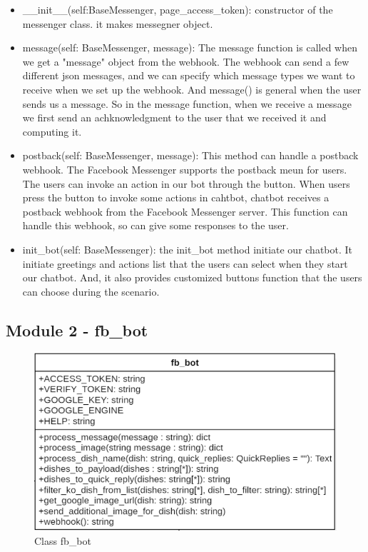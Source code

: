 \begin{itemize}
\item \_\_init\_\_(self:BaseMessenger, page\_access\_token): constructor of the messenger class. it makes messegner object.\newline
\item message(self: BaseMessenger, message): The message function is called when we get a "message" object from the webhook. The webhook can send a few different json messages, and we can specify which message types we want to receive when we set up the webhook. And message() is general when the user sends us a message. So in the message function, when we receive a message we first send an achknowledgment to the user that we received it and computing it. \newline
\item postback(self: BaseMessenger, message): This method can handle a postback webhook. The Facebook Messenger supports the postback meun for users. The users can invoke an action in our bot through the button. When users press the button to invoke some actions in cahtbot, chatbot receives a postback webhook from the Facebook Messenger server. This function can handle this webhook, so can give some responses to the user. \newline
\item init\_bot(self: BaseMessenger): the init\_bot method initiate our chatbot. It initiate greetings and actions list that the users can select when they start our chatbot. And, it also provides customized buttons function that the users can choose during the scenario. 
\end{itemize} 

\FloatBarrier

\subsection{Module 2 - fb\_bot}


\begin{figure}[htbp]
\centerline{\includegraphics[width=\linewidth]{./pictures/class_fb_bot}}
\caption{Class fb\_bot}
\label{fig:class_fb_bot}
\end{figure}
\FloatBarrier


